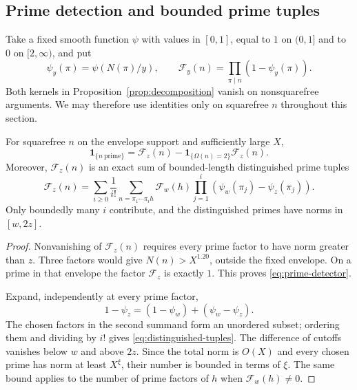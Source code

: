 
\subsection{Prime detection and bounded prime tuples}

Take a fixed smooth function $\psi$ with values in $[0,1]$, equal to
$1$ on $(0,1]$ and to $0$ on $[2,\infty)$, and put
\[
 \psi_y(\pi)=\psi(N(\pi)/y),\qquad
 \mathcal F_y(n)=\prod_{\pi\mid n}(1-\psi_y(\pi)).
\]
Both kernels in Proposition~\ref{prop:decomposition} vanish on
nonsquarefree arguments.  We may therefore use identities only on
squarefree $n$ throughout this section.

\begin{lemma}\label{lem:prime-detector}
For squarefree $n$ on the envelope support and sufficiently large $X$,
\begin{equation}\label{eq:prime-detector}
 \boldsymbol 1_{\{n\ {\mathrm{prime}}\}}
 =\mathcal F_z(n)-
  \boldsymbol 1_{\{\Omega(n)=2\}}\mathcal F_z(n).
\end{equation}
Moreover, $\mathcal F_z(n)$ is an exact sum of bounded-length
distinguished prime tuples
\begin{equation}\label{eq:distinguished-tuples}
 \mathcal F_z(n)=
 \sum_{i\ge0}\frac1{i!}
 \sum_{n=\pi_1\cdots\pi_i h}
 \mathcal F_w(h)\prod_{j=1}^i
       (\psi_w(\pi_j)-\psi_z(\pi_j)).
\end{equation}
Only boundedly many $i$ contribute, and the distinguished primes
have norms in $[w,2z]$.
\end{lemma}

\begin{proof}
Nonvanishing of $\mathcal F_z(n)$ requires every prime factor to have
norm greater than $z$.  Three factors would give $N(n)>X^{1.20}$,
outside the fixed envelope.  On a prime in that envelope the factor
$\mathcal F_z$ is exactly $1$.  This proves
\eqref{eq:prime-detector}.

Expand, independently at every prime factor,
\[
 1-\psi_z=(1-\psi_w)+(\psi_w-\psi_z).
\]
The chosen factors in the second summand form an unordered subset;
ordering them and dividing by $i!$ gives
\eqref{eq:distinguished-tuples}.  The difference of cutoffs vanishes
below $w$ and above $2z$.  Since the total norm is $O(X)$ and every
chosen prime has norm at least $X^\xi$, their number is bounded in
terms of $\xi$.  The same bound applies to the number of prime factors
of $h$ when $\mathcal F_w(h)\ne0$.
\end{proof}

